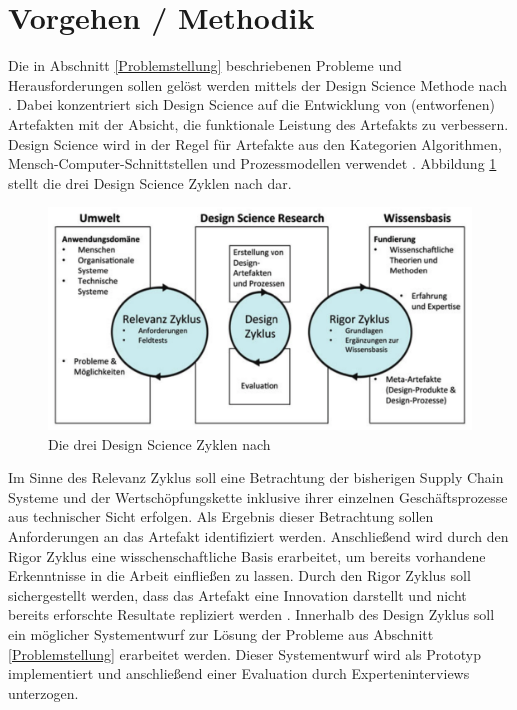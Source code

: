 \section{Vorgehen / Methodik}

Die in Abschnitt \ref{Problemstellung} beschriebenen Probleme und Herausforderungen sollen gelöst werden mittels der Design Science Methode nach \citet{Hevner2004, Hevner2007}. Dabei konzentriert sich Design Science auf die Entwicklung von (entworfenen) Artefakten mit der Absicht, die funktionale Leistung des Artefakts zu verbessern. Design Science wird in der Regel für Artefakte aus den Kategorien Algorithmen, Mensch-Computer-Schnittstellen und Prozessmodellen verwendet \citep{Peffers2012, Kuechler2008}. Abbildung \ref{fig:three-cycles-design-science} stellt die drei Design Science Zyklen nach \citet{Hevner2010} dar.

\begin{figure}[h!]
	\centering
	\includegraphics[width=0.70\linewidth]{pictures/three-cycles-design-science}
	\caption[Die drei Design Science Zyklen nach Hevner]{Die drei Design Science Zyklen nach \citet{Hevner2010} \citep{Trepper2015}}
	\label{fig:three-cycles-design-science}
\end{figure}

Im Sinne des Relevanz Zyklus \citep[siehe auch][]{Simon1996} soll eine Betrachtung der bisherigen Supply Chain Systeme und der Wertschöpfungskette inklusive ihrer einzelnen Geschäftsprozesse aus technischer Sicht erfolgen. Als Ergebnis dieser Betrachtung sollen Anforderungen an das Artefakt identifiziert werden. Anschließend wird durch den Rigor Zyklus eine wisschenschaftliche Basis erarbeitet, um bereits vorhandene Erkenntnisse in die Arbeit einfließen zu lassen. Durch den Rigor Zyklus soll sichergestellt werden, dass das Artefakt eine Innovation darstellt und nicht bereits erforschte Resultate repliziert werden \citep{Hevner2010}. Innerhalb des Design Zyklus soll ein möglicher Systementwurf zur Lösung der Probleme aus Abschnitt \ref{Problemstellung} erarbeitet werden. Dieser Systementwurf wird als Prototyp implementiert und anschließend einer Evaluation durch Experteninterviews \citep[siehe auch][]{Wilde2007} unterzogen.

\newpage
